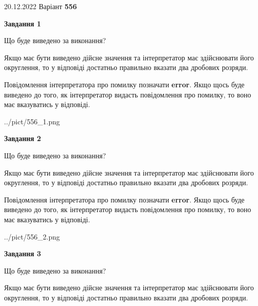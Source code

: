 \documentclass[12pt, ukrainian]{article}
\begin{document}
{20.12.2022 Варіант \No \textbf { 556 }\par}
{
\begin {Large}

{\begin {center}\textbf{Завдання 1}\end {center}}\par
Що буде виведено за виконання? \par

Якщо має бути виведено дійсне значення та інтерпретатор має здійснювати його округлення, 
то у відповіді достатньо правильно вказати два дробових розряди.

Повідомлення інтерпретатора про помилку позначати \textbf{error}.
Якщо щось буде виведено до того, як інтерпретатор видасть повідомлення про помилку, 
то воно має вказуватись у відповіді. \par

\begin{center}
	{../pict/556_1.png}
\end{center}
\newpage

{\begin {center}\textbf{Завдання 2}\end {center}}\par
Що буде виведено за виконання? \par

Якщо має бути виведено дійсне значення та інтерпретатор має здійснювати його округлення, 
то у відповіді достатньо правильно вказати два дробових розряди.

Повідомлення інтерпретатора про помилку позначати \textbf{error}.
Якщо щось буде виведено до того, як інтерпретатор видасть повідомлення про помилку, 
то воно має вказуватись у відповіді. \par

\begin{center}
	{../pict/556_2.png}
\end{center}
\newpage

{\begin {center}\textbf{Завдання 3}\end {center}}\par
Що буде виведено за виконання? \par

Якщо має бути виведено дійсне значення та інтерпретатор має здійснювати його округлення, 
то у відповіді достатньо правильно вказати два дробових розряди.


\end{Large}}
\end{document}

